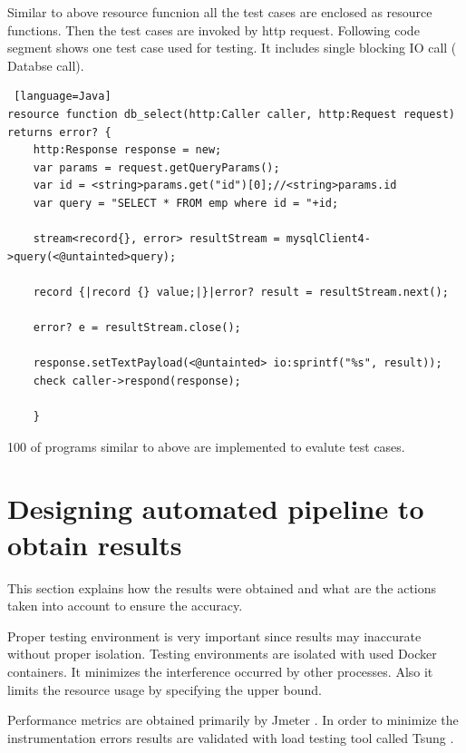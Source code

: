Similar to above resource funcnion all the test cases are enclosed as resource functions. Then the test cases are invoked by http request. Following code segment shows one test case used for testing. It includes single blocking IO call ( Databse call). 

\begin{lstlisting} [language=Java]
resource function db_select(http:Caller caller, http:Request request) returns error? {
	http:Response response = new;
	var params = request.getQueryParams();
	var id = <string>params.get("id")[0];//<string>params.id
	var query = "SELECT * FROM emp where id = "+id;
	
	stream<record{}, error> resultStream = mysqlClient4->query(<@untainted>query);
	
	record {|record {} value;|}|error? result = resultStream.next();
	
	error? e = resultStream.close();
	
	response.setTextPayload(<@untainted> io:sprintf("%s", result));
	check caller->respond(response);
	
	}
\end{lstlisting}

100 of programs similar to above are implemented to evalute test cases.

\section{Designing automated pipeline to obtain results}

This section explains how the results were obtained and what are the actions taken into account to ensure the accuracy. 

Proper testing environment is very important since results may inaccurate without proper isolation. Testing environments are isolated with used Docker \cite{docker} containers. It minimizes the interference occurred by other processes. Also it limits the resource usage by specifying the upper bound. 

Performance metrics are obtained primarily by Jmeter \cite{jmeter}. In order to minimize the instrumentation errors results are validated with load testing tool called Tsung \cite{tsung}.

